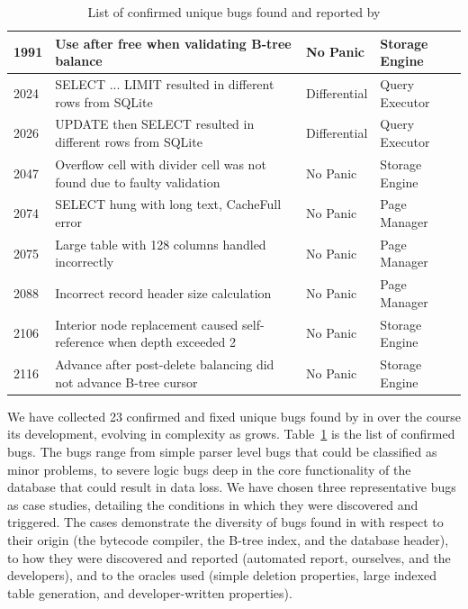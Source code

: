 \begin{singlespace}
\begin{footnotesize}
\begin{table}[h!]
{\begin{tabular}{ | p{} | p{} | p{} | p{} |}
          \hline
          1991         & Use after free when validating B-tree balance                              & No Panic         & Storage Engine  \\
          \hline
          2024         & SELECT ... LIMIT resulted in different rows from SQLite                    & Differential     & Query Executor  \\
          \hline
          2026         & UPDATE then SELECT resulted in different rows from SQLite                  & Differential     & Query Executor  \\
          \hline
          2047         & Overflow cell with divider cell was not found due to faulty validation     & No Panic         & Storage Engine  \\
          \hline
          2074         & SELECT hung with long text, CacheFull error                                & No Panic         & Page Manager    \\
          \hline
          2075         & Large table with 128 columns handled incorrectly                           & No Panic         & Page Manager    \\
          \hline
          2088         & Incorrect record header size calculation                                   & No Panic         & Page Manager    \\
          \hline
          2106         & Interior node replacement caused self-reference when depth exceeded 2      & No Panic         & Storage Engine  \\
          \hline
          2116         & Advance after post-delete balancing did not advance B-tree cursor          & No Panic         & Storage Engine  \\
          \hline
        \end{tabular}%
      }
      \caption{List of confirmed unique \db{} bugs found and reported by \tool{}}
      \label{dirt:tab:bugs}
    \end{table}
  \end{footnotesize}
\end{singlespace}

We have collected 23 confirmed and fixed unique bugs found by \tool{} in \db{} over the
course its development, evolving in complexity as \db{} grows.
Table~\ref{dirt:tab:bugs} is the list of confirmed bugs. The bugs range from simple
parser level bugs that could be classified as minor problems, to severe logic bugs deep
in the core functionality of the database that could result in data loss. We have
chosen three representative bugs as case studies, detailing the conditions in which
they were discovered and triggered. The cases demonstrate the diversity of bugs found
in \db{} with respect to their origin (the bytecode compiler, the B-tree index, and the
database header), to how they were discovered and reported (automated report,
ourselves, and the developers), and to the oracles used (simple deletion properties,
large indexed table generation, and developer-written properties).

